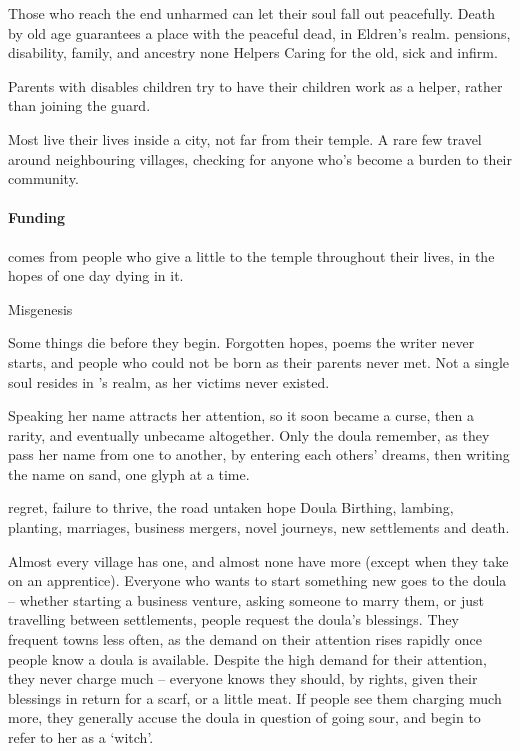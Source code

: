 \begin{multicols}{2}
{    Those who reach the end unharmed can let their soul fall out peacefully.
    Death by old age guarantees a place with the peaceful dead, in Eldren's realm.
  }%
  {pensions, disability, family, and ancestry}%
  {none}%
  {Helpers}%
  {
    Caring for the old, sick and infirm.
  }%

Parents with disables children try to have their children work as a helper, rather than joining the \gls{guard}.

Most live their lives inside a city, not far from their temple.
A rare few travel around neighbouring villages, checking for anyone who's become a burden to their community.

\paragraph{Funding}
comes from people who give a little to the temple throughout their lives, in the hopes of one day dying in it.

\guild{\hphantom{Nemo}}%
  {\decosix}%
  {Misgenesis}%
  {
  Some things die before they begin.
  Forgotten hopes, poems the writer never starts, and people who could not be born as their parents never met.
  Not a single soul resides in \hphantom{Nemo}'s realm, as her victims never existed.

  Speaking her name attracts her attention, so it soon became a curse, then a rarity, and eventually unbecame altogether.
  Only the doula remember, as they pass her name from one to another, by entering each others' dreams, then writing the name on sand, one glyph at a time.
  }%
  {regret, failure to thrive, the road untaken}%
  {hope}%
  {Doula}%
  {
    Birthing, lambing, planting, marriages, business mergers, novel journeys, new settlements and death.
  }%

Almost every village has one, and almost none have more (except when they take on an apprentice).
Everyone who wants to start something new goes to the doula -- whether starting a business venture, asking someone to marry them, or just travelling between settlements, people request the doula's blessings.
They frequent towns less often, as the demand on their attention rises rapidly once people know a doula is available.
Despite the high demand for their attention, they never charge much -- everyone knows they should, by rights, given their blessings in return for a scarf, or a little meat.
If people see them charging much more, they generally accuse the doula in question of going sour, and begin to refer to her as a `witch'.


\end{multicols}

